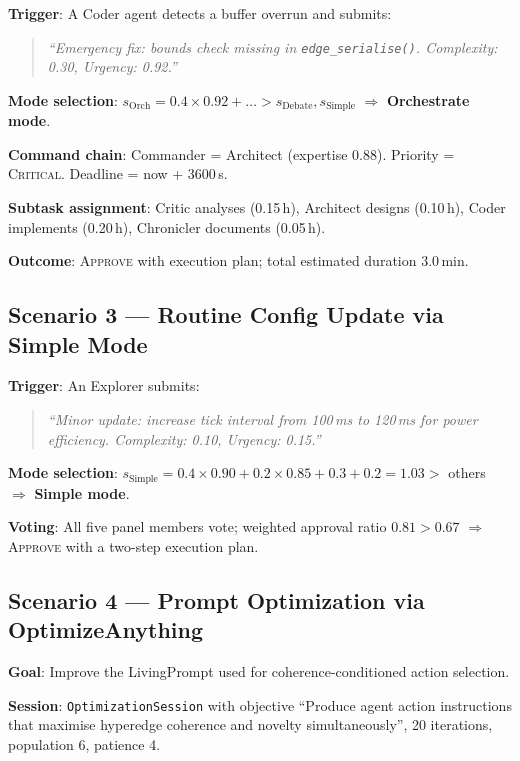 \documentclass[11pt]{article}
\begin{document}
\noindent\textbf{Trigger}: A Coder agent detects a buffer overrun and submits:
\begin{quote}
\small\itshape
``Emergency fix: bounds check missing in \texttt{edge\_serialise()}. Complexity:
0.30, Urgency: 0.92.''
\end{quote}

\noindent\textbf{Mode selection}: $s_{\text{Orch}} = 0.4 \times 0.92 + \ldots >
s_{\text{Debate}}, s_{\text{Simple}}$ $\Rightarrow$ \textbf{Orchestrate mode}.

\noindent\textbf{Command chain}: Commander = Architect (expertise 0.88). Priority
= \textsc{Critical}. Deadline = now + 3600\,s.

\noindent\textbf{Subtask assignment}: Critic analyses (0.15\,h), Architect
designs (0.10\,h), Coder implements (0.20\,h), Chronicler documents (0.05\,h).

\noindent\textbf{Outcome}: \textsc{Approve} with execution plan; total estimated
duration 3.0\,min.

\subsection{Scenario 3 --- Routine Config Update via Simple Mode}

\noindent\textbf{Trigger}: An Explorer submits:
\begin{quote}
\small\itshape
``Minor update: increase tick interval from 100\,ms to 120\,ms for power
efficiency. Complexity: 0.10, Urgency: 0.15.''
\end{quote}

\noindent\textbf{Mode selection}: $s_{\text{Simple}} = 0.4 \times 0.90 + 0.2
\times 0.85 + 0.3 + 0.2 = 1.03 >$ others $\Rightarrow$ \textbf{Simple mode}.

\noindent\textbf{Voting}: All five panel members vote; weighted approval ratio
$0.81 > 0.67$ $\Rightarrow$ \textsc{Approve} with a two-step execution plan.

\subsection{Scenario 4 --- Prompt Optimization via OptimizeAnything}

\noindent\textbf{Goal}: Improve the LivingPrompt used for coherence-conditioned
action selection.

\noindent\textbf{Session}: \texttt{OptimizationSession} with objective
``Produce agent action instructions that maximise hyperedge coherence and novelty
simultaneously'', 20 iterations, population 6, patience 4.
\end{document}
